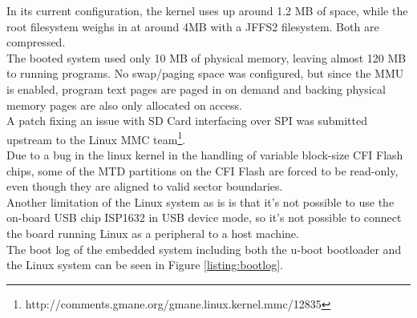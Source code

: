In its current configuration, the kernel uses up around 1.2 MB of space, while the root filesystem
weighs in at around 4MB with a JFFS2 filesystem. Both are compressed.
\\

The booted system used only 10 MB of physical memory, leaving almost 120 MB to running programs. No
swap/paging space was configured, but since the MMU is enabled, program text pages are paged in
on demand and backing physical memory pages are also only allocated on access.
\\

A patch fixing an issue with SD Card interfacing over SPI was submitted upstream to the Linux
MMC team\footnote{http://comments.gmane.org/gmane.linux.kernel.mmc/12835}.
\\

Due to a bug in the linux kernel in the handling of variable block-size CFI Flash chips,
some of the MTD partitions on the CFI Flash are forced to be read-only, even though they
are aligned to valid sector boundaries.
\\

Another limitation of the Linux system as is is that it's not possible to use the on-board
USB chip ISP1632 in USB device mode, so it's not possible to connect the board running Linux
as a peripheral to a host machine.
\\

The boot log of the embedded system including both the u-boot bootloader and the Linux system
can be seen in Figure \ref{listing:bootlog}.

